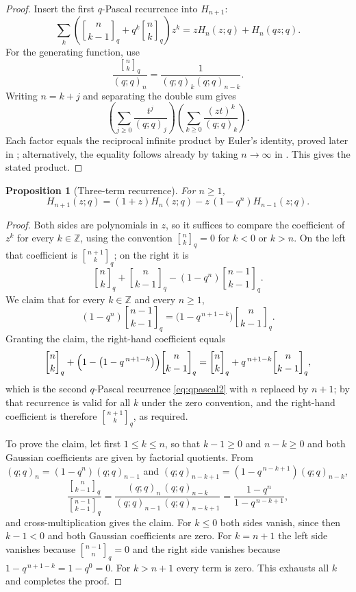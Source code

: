 \documentclass[11pt,oneside,openany]{book}
\newtheorem{proposition}[proposition]{Proposition}
\theoremstyle{definition}
\theoremstyle{remark}
\newcommand{\qbinom}[2]{\genfrac{[}{]}{0pt}{}{#1}{#2}_{q}}
\newcommand{\Z}{\mathbb Z}
\begin{document}
\begin{proof}
Insert the first $q$-Pascal recurrence into $H_{n+1}$:
\[
 \sum_k\left(\qbinom n{k-1}+q^k\qbinom nk\right)z^k
 =zH_n(z;q)+H_n(qz;q).
\]
For the generating function, use
\[
 \frac{\qbinom nk}{(q;q)_n}=\frac1{(q;q)_k(q;q)_{n-k}}.
\]
Writing $n=k+j$ and separating the double sum gives
\[
 \left(\sum_{j\ge0}\frac{t^j}{(q;q)_j}\right)
 \left(\sum_{k\ge0}\frac{(zt)^k}{(q;q)_k}\right).
\]
Each factor equals the reciprocal infinite product by Euler's identity, proved later in ; alternatively, the equality follows already by taking $n\to\infty$ in .  This gives the stated product.
\end{proof}

\begin{proposition}[Three-term recurrence]\label{prop:rogers-szego-three-term}
For $n\ge1$,
\[
 H_{n+1}(z;q)=(1+z)H_n(z;q)-z\,(1-q^n)H_{n-1}(z;q).
\]
\end{proposition}

\begin{proof}
Both sides are polynomials in $z$, so it suffices to compare the coefficient
of $z^k$ for every $k\in\Z$, using the convention $\qbinom nk=0$ for $k<0$ or
$k>n$.  On the left that coefficient is $\qbinom{n+1}k$; on the right it is
\[
 \qbinom nk+\qbinom n{k-1}-(1-q^n)\qbinom{n-1}{k-1}.
\]
We claim that for every $k\in\Z$ and every $n\ge1$,
\[
 (1-q^n)\qbinom{n-1}{k-1}=\bigl(1-q^{\,n+1-k}\bigr)\qbinom n{k-1}.
\]
Granting the claim, the right-hand coefficient equals
\[
 \qbinom nk+\Bigl(1-\bigl(1-q^{\,n+1-k}\bigr)\Bigr)\qbinom n{k-1}
 =\qbinom nk+q^{\,n+1-k}\qbinom n{k-1},
\]
which is the second $q$-Pascal recurrence \eqref{eq:qpascal2} with $n$
replaced by $n+1$; by  that recurrence is valid for all $k$
under the zero convention, and the right-hand coefficient is therefore
$\qbinom{n+1}k$, as required.

To prove the claim, let first $1\le k\le n$, so that $k-1\ge0$ and
$n-k\ge0$ and both Gaussian coefficients are given by factorial quotients.
From $(q;q)_n=(1-q^n)(q;q)_{n-1}$ and
$(q;q)_{n-k+1}=(1-q^{\,n-k+1})(q;q)_{n-k}$,
\[
 \frac{\qbinom n{k-1}}{\qbinom{n-1}{k-1}}
 =\frac{(q;q)_n\,(q;q)_{n-k}}{(q;q)_{n-1}\,(q;q)_{n-k+1}}
 =\frac{1-q^n}{1-q^{\,n-k+1}},
\]
and cross-multiplication gives the claim.  For $k\le0$ both sides vanish,
since then $k-1<0$ and both Gaussian coefficients are zero.  For $k=n+1$ the
left side vanishes because $\qbinom{n-1}{n}=0$ and the right side vanishes
because $1-q^{\,n+1-k}=1-q^0=0$.  For $k>n+1$ every term is zero.  This
exhausts all $k$ and completes the proof.
\end{proof}
\end{document}
